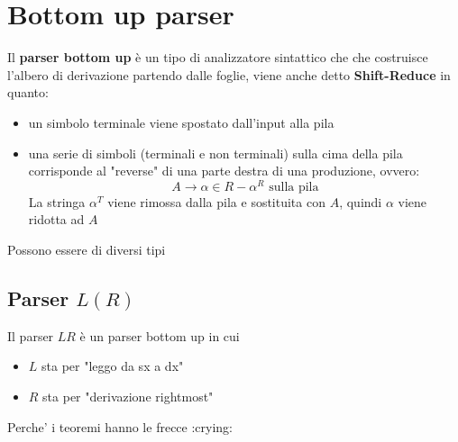 \chapter{Bottom up parser}

Il \textbf{parser bottom up} è un tipo di analizzatore sintattico che che costruisce l'albero di derivazione partendo dalle foglie, viene anche detto \textbf{Shift-Reduce} in quanto:
\begin{itemize}
    \item un simbolo terminale viene spostato dall'input alla pila
    \item una serie di simboli (terminali e non terminali) sulla cima della pila corrisponde al "reverse" di una parte destra di una produzione, ovvero:
    \[
        A\to\alpha \in R - \alpha^R \text{ sulla pila}
    \]
    La stringa $\alpha^T$ viene rimossa dalla pila e sostituita con $A$, quindi $\alpha$ viene ridotta ad $A$
\end{itemize}
 
Possono essere di diversi tipi

\section{Parser $L(R)$}
Il parser $LR$ è un parser bottom up in cui
\begin{itemize}
    \item $L$ sta per "leggo da sx a dx"
    \item $R$ sta per "derivazione rightmost"
\end{itemize}

Perche' i teoremi hanno le frecce :crying:
